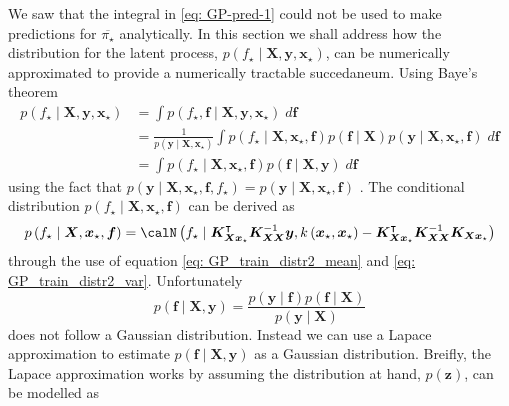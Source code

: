 We saw that the integral in \ref{eq: GP-pred-1} could not be used to make predictions for $\overline{\pi_{\star}}$ analytically. In this section we shall address how the distribution for the latent process, $p \left( f_{\star} \mid \bm{X} , \bm{y} , \bm{x}_{\star} \right)$, can be numerically approximated to provide a numerically tractable succedaneum. Using Baye's theorem
\begin{align*}
    p \left( f_{\star} \mid \bm{X} , \bm{y} , \bm{x}_{\star} \right)
     & = \int p \left( f_{\star} , \bm{f} \mid \bm{X} , \bm{y} , \bm{x}_{\star} \right) \; d \bm{f}                                                                                                                                                       \\
     & = \frac{1}{p \left( \bm{y} \mid \bm{X} , \bm{x}_{\star} \right)} \int p \left( f_{\star} \mid \bm{X} , \bm{x}_{\star}, \bm{f} \right) p \left( \bm{f} \mid \bm{X} \right) p \left( \bm{y} \mid \bm{X} , \bm{x}_{\star}, \bm{f} \right) \; d \bm{f} \\
     & = \int p \left( f_{\star} \mid \bm{X} , \bm{x}_{\star}, \bm{f} \right) p \left( \bm{f} \mid \bm{X} , \bm{y} \right) \; d \bm{f}
\end{align*}
using the fact that $p \left( \bm{y} \mid \bm{X} , \bm{x}_{\star}, \bm{f}, f_{\star} \right) = p \left( \bm{y} \mid \bm{X} , \bm{x}_{\star}, \bm{f} \right)$ \cite{BishopChristopherM2006Pram, RasmussenCarlEdward2006Gpfm}. The conditional distribution $p \left( f_{\star} \mid \bm{X} , \bm{x}_{\star}, \bm{f} \right)$ can be derived as
\begin{equation*}
    p \left( f_{\star} \mid \bm{X} , \bm{x}_{\star}, \bm{f} \right) = \calN \left( f_{\star} \mid \bm{K}_{\bm{X} \bm{x}_{\star}}^{\intercal} \bm{K}_{\bm{X} \bm{X}}^{-1} \bm{y}, k \left( \bm{x}_{\star}, \bm{x}_{\star} \right) - \bm{K}_{\bm{X} \bm{x}_{\star}}^{\intercal} \bm{K}_{\bm{X} \bm{X}}^{-1} \bm{K}_{\bm{X} \bm{x}_{\star}} \right)
\end{equation*}
through the use of equation \ref{eq: GP_train_distr2_mean} and \ref{eq: GP_train_distr2_var}. Unfortunately
\begin{equation*}
    p \left( \bm{f} \mid \bm{X} , \bm{y} \right) = \frac{p \left( \bm{y} \mid \bm{f} \right) p \left( \bm{f} \mid \bm{X} \right) }{p \left( \bm{y} \mid \bm{X} \right)}
\end{equation*}
does not follow a Gaussian distribution. Instead we can use a Lapace approximation to estimate $p \left( \bm{f} \mid \bm{X} , \bm{y} \right)$ as a Gaussian distribution. Breifly, the Lapace approximation works by assuming the distribution at hand, $p \left( \bm{z} \right)$, can be modelled as
